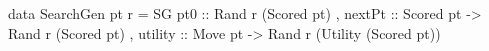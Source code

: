 data SearchGen pt r = 
 SG { pt0     ::              Rand r (Scored pt)
    , nextPt  :: Scored pt -> Rand r (Scored pt)
    , utility :: Move pt   -> Rand r (Utility (Scored pt))
    }
